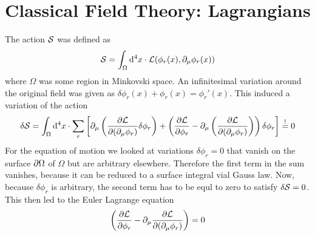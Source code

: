 

\chapter{Classical Field Theory: Lagrangians}

The action $\mathcal{S}$ was defined as
\[ \mathcal{S} = \int_\Omega {\rm d}^4 x \cdot \mathcal{L}( \phi_r(x), \partial_\mu \phi_r(x))\]
where $\Omega$ was some region in Minkovski space. An infinitesimal variation around the original field was given as $\delta \phi_r(x) + \phi_r(x) = \phi_r'(x)$. This induced a variation of the action
\[ \delta \mathcal{S} = \int_\Omega {\rm d}^4 x \cdot \sum_r \left[ \partial_\mu \left( \frac{\partial \mathcal{L}}{\partial (\partial_\mu \phi_r)} \delta \phi_r \right) + \left( \frac{ \partial \mathcal{L}}{\partial \phi_r} - \partial_\mu \left( \frac{\partial \mathcal{L}}{\partial (\partial_\mu \phi_r)}\right) \right)  \delta \phi_r\right]\overset{!}{=} 0 \]
For the equation of motion we looked at variations $\delta \phi_r = 0$ that vanish on the surface $\partial \Omega$ of $\Omega$ but are arbitrary elsewhere. Therefore the first term in the sum vanishes, because it can be reduced to a surface integral vial Gauss law. Now, because $\delta \phi_r$ is arbitrary, the second term has to be equl to zero to satisfy $\delta \mathcal{S} = 0$. This then led to the Euler Lagrange equation
\[ \left( \frac{\partial \mathcal{L}}{\partial \phi_r} - \partial_\mu \frac{\partial \mathcal{L}}{\partial ( \partial_\mu \phi_r)} \right) = 0\] 

